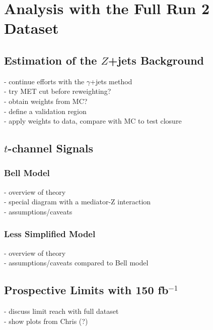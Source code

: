 \chapter{Analysis with the Full Run 2 Dataset}

\section{Estimation of the $Z$+jets Background}

- continue efforts with the $\gamma$+jets method\\
- try MET cut before reweighting?\\
- obtain weights from MC?\\
- define a validation region\\
- apply weights to data, compare with MC to test closure\\

\section{$t$-channel Signals}

\subsection{Bell Model}

- overview of theory\\
- special diagram with a mediator-Z interaction\\
- assumptions/caveats\\

\subsection{Less Simplified Model}

- overview of theory\\
- assumptions/caveats compared to Bell model\\

\section{Prospective Limits with 150 fb$^{-1}$}

- discuss limit reach with full dataset\\
- show plots from Chris (?)\\
